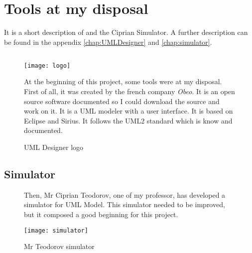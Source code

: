 







\section{Tools at my disposal}

It is a short description of \umld and the Ciprian Simulator. A further description can be found in the appendix \ref{chap:UMLDesigner} and \ref{chap:simulator}.
\newpage
\subsection{\umld}
\begin{figure}[!h]
  \begin{minipage}[h]{0.45\linewidth}
    \centering
    \texttt{[image: logo]}
    \caption{UML Designer logo}
    \label{fig:logo}
  \end{minipage}\hfill
  \begin{minipage}[h]{0.45\linewidth}

    At the beginning of this project, some tools were at my disposal. First of all, it was \umld created by the french company \textit{Obeo}. It is an open source software documented so I could download the source and work on it. It is a UML modeler with a user interface. It is based on Eclipse and Sirius. It follows the UML2 standard which is know and documented.

  \end{minipage}
\end{figure}


\subsection{Simulator}
\begin{figure}[!h]
  \begin{minipage}[h]{0.45\linewidth}

    Then, Mr Ciprian Teodorov, one of my professor, has developed a simulator for UML Model. This simulator needed to be improved, but it composed a good beginning for this project.

  \end{minipage}\hfill
  \begin{minipage}[h]{0.45\linewidth}
    \centering
    \texttt{[image: simulator]}
    \caption{Mr Teodorov simulator}
    \label{fig:sim}
  \end{minipage}
\end{figure}







